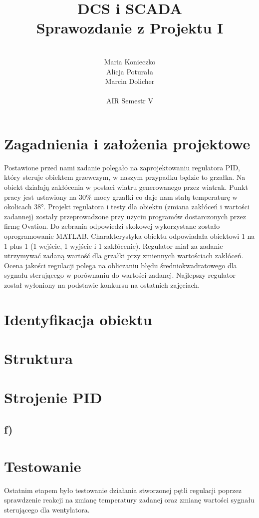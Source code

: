 \documentclass[12pt, a4paper]{article}
\author{
	\\ Maria Konieczko
	\\ Alicja Poturała
	\\ Marcin Dolicher
	\\
	\\ AIR Semestr V
}
\title{	
    DCS i SCADA \\
	Sprawozdanie z Projektu I		
}
\date{}
\begin{document}
\maketitle
\newpage
\tableofcontents

\newpage
\section{Zagadnienia i założenia projektowe}
Postawione przed nami zadanie polegało na zaprojektowaniu regulatora PID, który steruje obiektem grzewczym, w naszym przypadku będzie to grzałka. Na obiekt działają zakłócenia w postaci wiatru generowanego przez wiatrak. Punkt pracy jest ustawiony na $30 \%$ mocy grzałki co daje nam stałą temperaturę w okolicach \ang{38}. Projekt regulatora i testy dla obiektu (zmiana zakłóceń i wartości zadannej) zostały przeprowadzone przy użyciu programów dostarczonych przez firmę Ovation. Do zebrania odpowiedzi skokowej wykorzystane zostało oprogramowanie MATLAB. Charakterystyka obiektu odpowiadała obiektowi 1 na 1 plus 1 (1 wejście, 1 wyjście i 1 zakłócenie). Regulator miał za zadanie utrzymywać zadaną wartość dla grzałki przy zmiennych wartościach zakłóceń. Ocena jakości regulacji polega na obliczaniu błędu średniokwadratowego dla sygnału sterującego w porównaniu do wartości zadanej. Najlepszy regulator został wyłoniony na podstawie konkursu na ostatnich zajęciach. 
\section{Identyfikacja obiektu}

\section{Struktura}

\section{Strojenie PID}

\subsection{f) }
\begin{figure}[h!]
\end{figure}
\newpage
\section{Testowanie}
Ostatnim etapem było testowanie działania stworzonej pętli regulacji poprzez sprawdzenie reakcji na zmianę temperatury zadanej oraz zmianę wartości sygnału sterującego dla wentylatora. 
\end{document}
